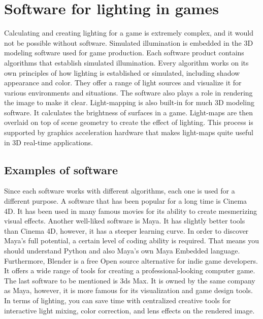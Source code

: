 \documentclass[10pt,twoside,english,a4paper]{article}
\begin{document}
\section{Software for lighting in games} \label{fourth}
Calculating and creating lighting for a game is extremely complex, and it would not be possible without software. Simulated illumination is embedded in the 3D modeling software used for game production. Each software product contains algorithms that establish simulated illumination. Every algorithm works on its own principles of how lighting is established or simulated, including shadow appearance and color. \cite{Dynamic-Lighting} They offer a range of light sources and visualize it for various environments and situations. The software also plays a role in rendering the image to make it clear. Light-mapping is also built-in for much 3D modeling software. It calculates the brightness of surfaces in a game. Light-maps are then overlaid on top of scene geometry to create the effect of lighting. This process is supported by graphics acceleration hardware that makes light-maps quite useful in 3D real-time applications.\cite{Fast-Lighting} \cite{Unity}


\subsection{Examples of software} \label{examples}

Since each software works with different algorithms, each one is used for a different purpose. A software that has been popular for a long time is Cinema 4D. It has been used in many famous movies for its ability to create mesmerizing visual effects. Another well-liked software is Maya. It has slightly better tools than Cinema 4D, however, it has a steeper learning curve. In order to discover Maya’s full potential, a certain level of coding ability is required. That means you should understand Python and also Maya’s own Maya Embedded language. \cite{maya} Furthermore, Blender is a free Open source alternative for indie game developers. It offers a wide range of tools for creating a professional-looking computer game. The last software to be mentioned is 3ds Max. It is owned by the same company as Maya, however, it is more famous for its visualization and game design tools. \cite{maya} In terms of lighting, you can save time with centralized creative tools for interactive light mixing, color correction, and lens effects on the rendered image.\cite{3ds} 
\end{document}
